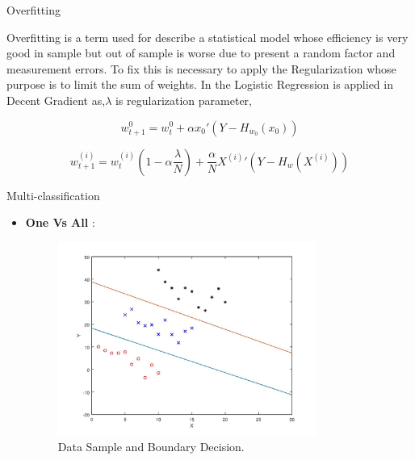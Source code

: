 \documentclass{beamer}
\begin{document}
\begin{frame}{Overfitting}

Overfitting is a term used for describe a statistical model whose efficiency is very good in sample but out of sample is worse due to present a random factor and  measurement errors. To fix this is necessary to apply the Regularization whose purpose is to limit the sum of weights. In the Logistic Regression is applied in Decent Gradient as,$\lambda$ is regularization parameter,

\begin{equation}
w^0_{t+1} = w^0_t + \alpha x_0 ' (Y - H_{w_0}(x_0))
\end{equation}

\begin{equation}
w^{(i)}_{t+1} = w^{(i)}_{t} (1 - \alpha\frac{\lambda}{N}) + \frac{\alpha}{N} X^{(i)}' (Y - H_w(X^{(i)}))
\end{equation}

\end{frame}

\begin{frame}{Multi-classification}
\begin{itemize}
\item \textbf{One Vs All} : 

\begin{figure}
\centering
\includegraphics[width=0.8\textwidth]{Amostra_Multi_Class.jpg}
\caption{Data Sample and Boundary Decision.}

\end{figure}	
\end{itemize}
	

\end{frame}

\end{document}
